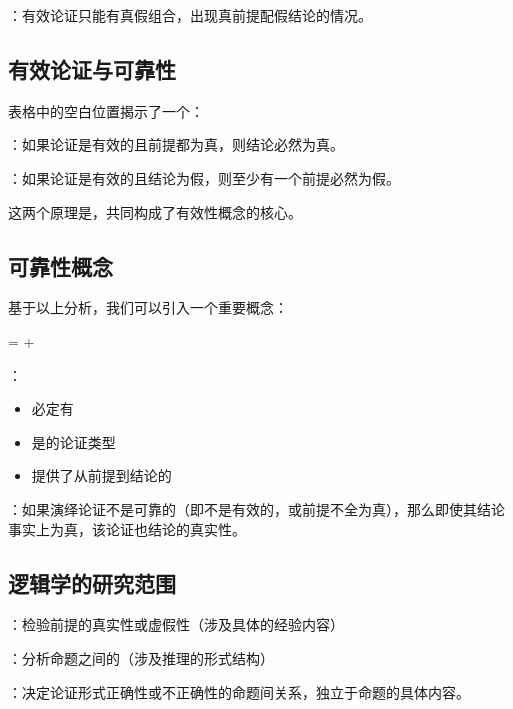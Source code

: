 ：有效论证只能有真假组合，出现真前提配假结论的情况。

\subsection{有效论证与可靠性}

表格中的空白位置揭示了一个：

\begin{theorembox}[title=有效性的根本保证]
：如果论证是有效的且前提都为真，则结论必然为真。

：如果论证是有效的且结论为假，则至少有一个前提必然为假。

这两个原理是，共同构成了有效性概念的核心。
\end{theorembox}

\subsection{可靠性概念}

基于以上分析，我们可以引入一个重要概念：

\begin{theorembox}[title=可靠性的定义]
 =  + 

：
\begin{itemize}
  \item 必定有
  \item 是的论证类型
  \item 提供了从前提到结论的
\end{itemize}
\end{theorembox}

：如果演绎论证不是可靠的（即不是有效的，或前提不全为真），那么即使其结论事实上为真，该论证也结论的真实性。

\subsection{逻辑学的研究范围}

\begin{theorembox}[title=逻辑学与其他学科的分工]
：检验前提的真实性或虚假性（涉及具体的经验内容）

：分析命题之间的（涉及推理的形式结构）

：决定论证形式正确性或不正确性的命题间关系，独立于命题的具体内容。
\end{theorembox}

